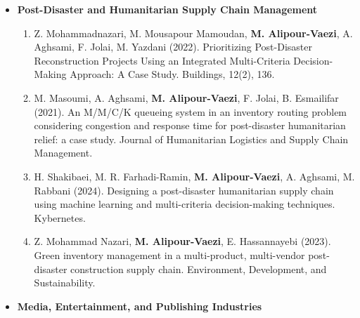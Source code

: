 \documentclass[9pt,a4paper]{extarticle}
\newcommand{\CategoryFont}
    {\fontsize{9.5}{10.35}\selectfont}
\newcommand{\BodyFont}
    {\fontsize{8.5}{9.30}\selectfont}
\newcommand{\cvcategory}[1]{%
    {\CategoryFont\bfseries\color{CVBody}#1}%
}
\newenvironment{cvcatlist}{%
    \begin{itemize}[
        leftmargin=0pt,
        labelsep=0pt,
        label={},
        topsep=0pt,
        itemsep=-0.5pt,
        parsep=0pt,
        partopsep=0pt
    ]
}{%
    \end{itemize}
}
\newenvironment{cvsublist}{%
    \begin{enumerate}[
        leftmargin=0.24in,
        labelsep=0.04in,
        label={\BodyFont\color{CVBody}\arabic*.},
        start=1,
        topsep=-0.8pt,
        itemsep=-0.8pt,
        parsep=0pt,
        partopsep=0pt
    ]
}{%
    \end{enumerate}
}
\newcommand{\pubitem}[1]{%
    \item\relax
    {\BodyFont\color{CVBody}\ignorespaces#1\unskip}%
}
\begin{document}
\begin{cvcatlist}
\begin{cvsublist}
\pubitem{
N. Abdali,
\textbf{M. Alipour-Vaezi},
A. Aghsami,
M. Rabbani
(2024).
A new data-driven decision-making method
for therapist-patient allocation and scheduling.
Journal of Industrial and Systems Engineering.
}

\end{cvsublist}



\item \cvcategory{Post-Disaster and Humanitarian Supply Chain Management}

\begin{cvsublist}

\pubitem{
Z. Mohammadnazari,
M. Mousapour Mamoudan,
\textbf{M. Alipour-Vaezi},
A. Aghsami,
F. Jolai,
M. Yazdani
(2022).
Prioritizing Post-Disaster Reconstruction Projects
Using an Integrated Multi-Criteria Decision-Making Approach:
A Case Study.
Buildings, 12(2), 136.
}

\pubitem{
M. Masoumi,
A. Aghsami,
\textbf{M. Alipour-Vaezi},
F. Jolai,
B. Esmailifar
(2021).
An M/M/C/K queueing system in an inventory routing problem
considering congestion and response time
for post-disaster humanitarian relief:
a case study.
Journal of Humanitarian Logistics and Supply Chain Management.
}

\pubitem{
H. Shakibaei,
M. R. Farhadi-Ramin,
\textbf{M. Alipour-Vaezi},
A. Aghsami,
M. Rabbani
(2024).
Designing a post-disaster humanitarian supply chain
using machine learning and multi-criteria decision-making techniques.
Kybernetes.
}

\pubitem{
Z. Mohammad Nazari,
\textbf{M. Alipour-Vaezi},
E. Hassannayebi
(2023).
Green inventory management in a multi-product,
multi-vendor post-disaster construction supply chain.
Environment, Development, and Sustainability.
}

\end{cvsublist}



\item \cvcategory{Media, Entertainment, and Publishing Industries}

\begin{cvsublist}


\end{cvsublist}
\end{cvcatlist}
\end{document}
